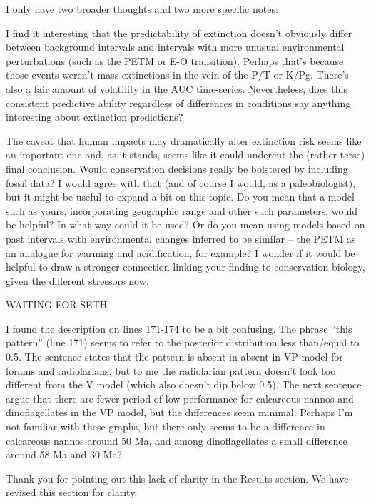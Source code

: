\documentclass[12pt,letterpaper]{article}
\begin{document}
\begin{refsection}
\begin{bfseries}
  I only have two broader thoughts and two more specific notes:

  I find it interesting that the predictability of extinction doesn’t obviously differ between background intervals and intervals with more unusual environmental perturbations (such as the PETM or E-O transition). Perhaps that’s because those events weren’t mass extinctions in the vein of the P/T or K/Pg. There’s also a fair amount of volatility in the AUC time-series. Nevertheless, does this consistent predictive ability regardless of differences in conditions say anything interesting about extinction predictions?

  The caveat that human impacts may dramatically alter extinction risk seems like an important one and, as it stands, seems like it could undercut the (rather terse) final conclusion. Would conservation decisions really be bolstered by including fossil data? I would agree with that (and of course I would, as a paleobiologist), but it might be useful to expand a bit on this topic. Do you mean that a model such as yours, incorporating geographic range and other such parameters, would be helpful? In what way could it be used? Or do you mean using models based on past intervals with environmental changes inferred to be similar – the PETM as an analogue for warming and acidification, for example? I wonder if it would be helpful to draw a stronger connection linking your finding to conservation biology, given the different stressors now.
\end{bfseries}

WAITING FOR SETH

\begin{bfseries}
  I found the description on lines 171-174 to be a bit confusing. The phrase “this pattern” (line 171) seems to refer to the posterior distribution less than/equal to 0.5. The sentence states that the pattern is absent in absent in VP model for forams and radiolarians, but to me the radiolarian pattern doesn’t look too different from the V model (which also doesn’t dip below 0.5). The next sentence argue that there are fewer period of low performance for calcareous nannos and dinoflagellates in the VP model, but the differences seem minimal. Perhaps I’m not familiar with these graphs, but there only seems to be a difference in calcareous nannos around 50 Ma, and among dinoflagellates a small difference around 58 Ma and 30 Ma?
\end{bfseries}

Thank you for pointing out this lack of clarity in the Results section. We have revised this section for clarity.


\end{refsection}
\end{document}

